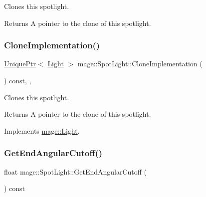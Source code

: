 Clones this spotlight.

\begin{DoxyReturn}{Returns}
A pointer to the clone of this spotlight. 
\end{DoxyReturn}
\hypertarget{classmage_1_1_spot_light_a060044ae1de97143878ad26524f03709}{}\label{classmage_1_1_spot_light_a060044ae1de97143878ad26524f03709} 
\subsubsection{\texorpdfstring{Clone\+Implementation()}{CloneImplementation()}}
{\footnotesize\ttfamily \hyperlink{namespacemage_a8c307fbcc33bce9b7f2aa4c26c3b95cf}{Unique\+Ptr}$<$ \hyperlink{classmage_1_1_light}{Light} $>$ mage\+::\+Spot\+Light\+::\+Clone\+Implementation (\begin{DoxyParamCaption}{ }\end{DoxyParamCaption}) const\hspace{0.3cm}{\ttfamily [override]}, {\ttfamily [private]}, {\ttfamily [virtual]}}

Clones this spotlight.

\begin{DoxyReturn}{Returns}
A pointer to the clone of this spotlight. 
\end{DoxyReturn}


Implements \hyperlink{classmage_1_1_light_aa613d76a1ebda69efde853d15f75490c}{mage\+::\+Light}.

\hypertarget{classmage_1_1_spot_light_a9e1ec369a3f42a4662c4cde2aa4a9ac4}{}\label{classmage_1_1_spot_light_a9e1ec369a3f42a4662c4cde2aa4a9ac4} 
\subsubsection{\texorpdfstring{Get\+End\+Angular\+Cutoff()}{GetEndAngularCutoff()}}
{\footnotesize\ttfamily float mage\+::\+Spot\+Light\+::\+Get\+End\+Angular\+Cutoff (\begin{DoxyParamCaption}{ }\end{DoxyParamCaption}) const\hspace{0.3cm}{\ttfamily [noexcept]}}

